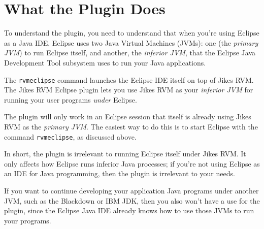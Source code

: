 \section{What the Plugin Does}

To understand the plugin, you need to understand that when you're
using Eclipse as a Java IDE, Eclipse uses two Java Virtual Machines
(JVMs): one (the {\em primary JVM}) to run Eclipse itself, and
another, the {\em inferior JVM}, that the Eclipse Java Development
Tool subsystem uses to run your Java applications.

The {\tt rvmeclipse} command launches the Eclipse IDE itself on top of
Jikes RVM.  The Jikes RVM Eclipse plugin lets you use Jikes RVM as
your {\em inferior JVM} for running your user programs {\em under} Eclipse.

The plugin will only work in an Eclipse session that itself is already
using Jikes RVM as the {\em primary JVM}.  The easiest way to do this
is to start Eclipse with the command {\tt rvmeclipse}, as discussed
above.

In short, the plugin is irrelevant to running Eclipse itself under
Jikes RVM.  It only affects how Eclipse runs inferior Java processes;
if you're not using Eclipse as an IDE for Java programming, then
the plugin is irrelevant to your needs.

If you want to continue developing your application Java programs
under another JVM, such as the Blackdown or IBM JDK, then you also
won't have a use for the plugin, since the Eclipse Java IDE already
knows how to use those JVMs to run your programs.


